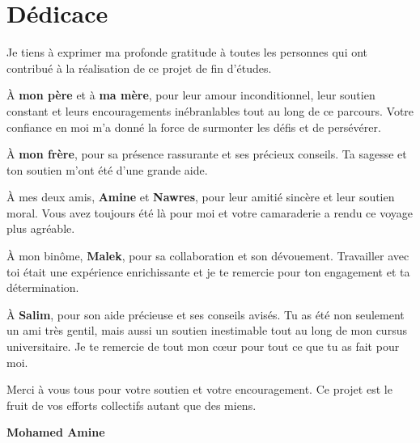 \thispagestyle{empty}

\chapter*{Dédicace}

Je tiens à exprimer ma profonde gratitude à toutes les personnes qui ont contribué à la réalisation de ce projet de fin d'études.
\vspace{1em}

À \textbf{mon père} et à \textbf{ma mère}, pour leur amour inconditionnel, leur soutien constant et leurs encouragements inébranlables tout au long de ce parcours. Votre confiance en moi m'a donné la force de surmonter les défis et de persévérer.

À \textbf{mon frère}, pour sa présence rassurante et ses précieux conseils. Ta sagesse et ton soutien m'ont été d'une grande aide.

À mes deux amis, \textbf{Amine} et \textbf{Nawres}, pour leur amitié sincère et leur soutien moral. Vous avez toujours été là pour moi et votre camaraderie a rendu ce voyage plus agréable.

À mon binôme, \textbf{Malek}, pour sa collaboration et son dévouement. Travailler avec toi était une expérience enrichissante et je te remercie pour ton engagement et ta détermination.

À \textbf{Salim}, pour son aide précieuse et ses conseils avisés. Tu as été non seulement un ami très gentil, mais aussi un soutien inestimable tout au long de mon cursus universitaire. Je te remercie de tout mon cœur pour tout ce que tu as fait pour moi.

\vspace{1em}
Merci à vous tous pour votre soutien et votre encouragement. Ce projet est le fruit de vos efforts collectifs autant que des miens.

\vfill
\hfill \textbf{Mohamed Amine}